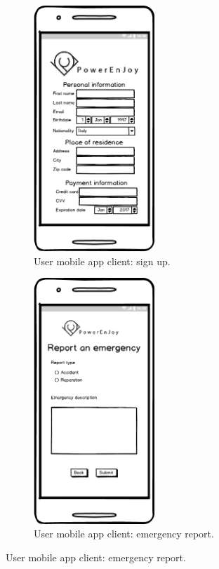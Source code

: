 	\begin{figure}[h]
		\begin{subfigure}{0.5\textwidth}
			\includegraphics[width=0.5\textwidth, center]{img/user_interface_design/App_sign_up.png}
			\caption{User mobile app client: sign up.}
		\end{subfigure}
		\begin{subfigure}{0.5\textwidth}
			\includegraphics[width=0.5\textwidth, center]{img/user_interface_design/User_emergency_report.png}
			\caption{User mobile app client: emergency report.}
		\end{subfigure}
	\end{figure}

